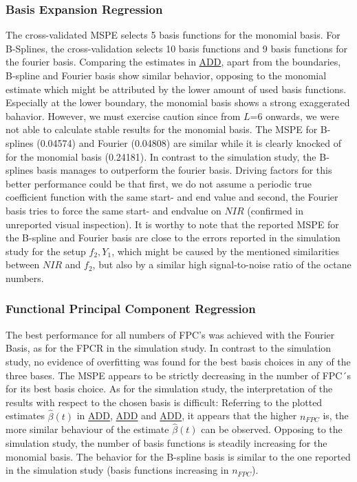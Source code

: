 \documentclass[11pt,twoside,a4paper]{article}
\begin{document}
		\subsubsection{Basis Expansion Regression}
		The cross-validated MSPE selects 5 basis functions for the monomial basis. For B-Splines, the cross-validation selects 10 basis functions and 9 basis functions for the fourier basis. Comparing the estimates in \hyperref[basis_expansion_estimate_appl]{ADD}, apart from the boundaries, B-spline and Fourier basis show similar behavior, opposing to the monomial estimate which might be attributed by the lower amount of used basis functions. Especially at the lower boundary, the monomial basis shows a strong exaggerated bahavior. However, we must exercise caution since from $L$=6 onwards, we were not able to calculate stable results for the monomial basis. The MSPE for B-splines (0.04574) and Fourier (0.04808) are similar while it is clearly knocked of for the monomial basis (0.24181). In contrast to the simulation study, the B-splines basis manages to outperform the fourier basis. Driving factors for this better performance could be that first, we do not assume a periodic true coefficient function with the same start- and end value and second, the Fourier basis tries to force the same start- and endvalue on $NIR$ (confirmed in unreported visual inspection). It is worthy to note that the reported MSPE for the B-spline and Fourier basis are close to the errors reported in the simulation study for the setup $f_2,Y_1$, which might be caused by the mentioned similarities between $NIR$ and $f_2$, but also by a similar high signal-to-noise ratio of the octane numbers. 
	
		\subsubsection{Functional Principal Component Regression}
		The best performance for all numbers of FPC's was achieved with the Fourier Basis, as for the FPCR in the simulation study. In contrast to the simulation study, no evidence of overfitting was found for the best basis choices in any of the three bases. The MSPE appears to be strictly decreasing in the number of FPC´s for its best basis choice. As for the simulation study, the interpretation of the results with respect to the chosen basis is difficult: Referring to the plotted estimates $\hat{\beta}(t)$ in \hyperref[FPCR2_estimate_appl]{ADD}, \hyperref[FPCR3_estimate_appl]{ADD} and \hyperref[FPCR4_estimate_appl]{ADD}, it appears that the higher $n_{FPC}$ is, the more similar behaviour of the estimate $\hat{\beta}(t)$ can be observed. Opposing to the simulation study, the number of basis functions is steadily increasing for the monomial basis. The behavior for the B-spline basis is similar to the one reported in the simulation study (basis functions increasing in $n_{FPC}$). 
	
\end{document}
